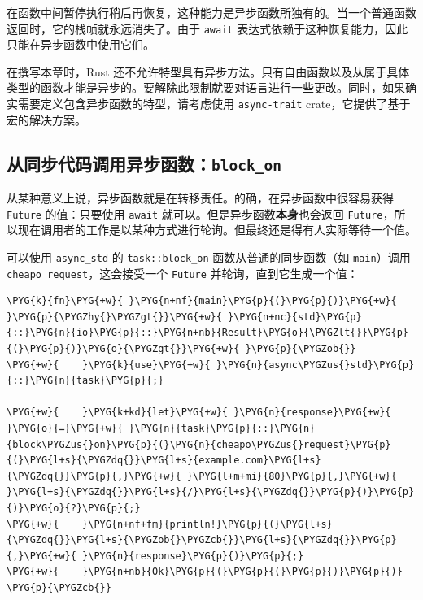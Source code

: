 在函数中间暂停执行稍后再恢复，这种能力是异步函数所独有的。当一个普通函数返回时，它的栈帧就永远消失了。由于 \texttt{await} 表达式依赖于这种恢复能力，因此只能在异步函数中使用它们。

在撰写本章时，Rust 还不允许特型具有异步方法。只有自由函数以及从属于具体类型的函数才能是异步的。要解除此限制就要对语言进行一些更改。同时，如果确实需要定义包含异步函数的特型，请考虑使用 \texttt{async-trait} crate，它提供了基于宏的解决方案。

\subsection{从同步代码调用异步函数：\texttt{block\_on}}

从某种意义上说，异步函数就是在转移责任。的确，在异步函数中很容易获得 \texttt{Future} 的值：只要使用 \texttt{await} 就可以。但是异步函数\textbf{本身}也会返回 \texttt{Future}，所以现在调用者的工作是以某种方式进行轮询。但最终还是得有人实际等待一个值。

可以使用 \texttt{async\_std} 的 \texttt{task::block\_on} 函数从普通的同步函数（如 \texttt{main}）调用 \texttt{cheapo\_request}，这会接受一个 \texttt{Future} 并轮询，直到它生成一个值：

\begin{Verbatim}[commandchars=\\\{\},breaklines=true,breakanywhere=true,fontsize=\codefont,xleftmargin=17bp]
\PYG{k}{fn}\PYG{+w}{ }\PYG{n+nf}{main}\PYG{p}{(}\PYG{p}{)}\PYG{+w}{ }\PYG{p}{\PYGZhy{}\PYGZgt{}}\PYG{+w}{ }\PYG{n+nc}{std}\PYG{p}{::}\PYG{n}{io}\PYG{p}{::}\PYG{n+nb}{Result}\PYG{o}{\PYGZlt{}}\PYG{p}{(}\PYG{p}{)}\PYG{o}{\PYGZgt{}}\PYG{+w}{ }\PYG{p}{\PYGZob{}}
\PYG{+w}{    }\PYG{k}{use}\PYG{+w}{ }\PYG{n}{async\PYGZus{}std}\PYG{p}{::}\PYG{n}{task}\PYG{p}{;}

\PYG{+w}{    }\PYG{k+kd}{let}\PYG{+w}{ }\PYG{n}{response}\PYG{+w}{ }\PYG{o}{=}\PYG{+w}{ }\PYG{n}{task}\PYG{p}{::}\PYG{n}{block\PYGZus{}on}\PYG{p}{(}\PYG{n}{cheapo\PYGZus{}request}\PYG{p}{(}\PYG{l+s}{\PYGZdq{}}\PYG{l+s}{example.com}\PYG{l+s}{\PYGZdq{}}\PYG{p}{,}\PYG{+w}{ }\PYG{l+m+mi}{80}\PYG{p}{,}\PYG{+w}{ }\PYG{l+s}{\PYGZdq{}}\PYG{l+s}{/}\PYG{l+s}{\PYGZdq{}}\PYG{p}{)}\PYG{p}{)}\PYG{o}{?}\PYG{p}{;}
\PYG{+w}{    }\PYG{n+nf+fm}{println!}\PYG{p}{(}\PYG{l+s}{\PYGZdq{}}\PYG{l+s}{\PYGZob{}\PYGZcb{}}\PYG{l+s}{\PYGZdq{}}\PYG{p}{,}\PYG{+w}{ }\PYG{n}{response}\PYG{p}{)}\PYG{p}{;}
\PYG{+w}{    }\PYG{n+nb}{Ok}\PYG{p}{(}\PYG{p}{(}\PYG{p}{)}\PYG{p}{)}
\PYG{p}{\PYGZcb{}}
\end{Verbatim}

